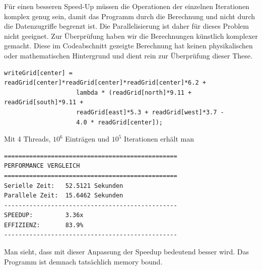 Für einen besseren Speed-Up müssen die Operationen der einzelnen Iterationen komplex genug sein, damit das Programm durch die Berechnung und nicht durch die Datenzugriffe begrenzt ist.
Die Parallelisierung ist daher für dieses Problem nicht geeignet.
Zur Überprüfung haben wir die Berechnungen künstlich komplexer gemacht.
Diese im Codeabschnitt gezeigte Berechnung hat keinen physikalischen oder mathematischen Hintergrund und dient rein zur Überprüfung dieser These.

\begin{lstlisting}
writeGrid[center] = readGrid[center]*readGrid[center]*readGrid[center]*6.2 +
					lambda * (readGrid[north]*9.11 + readGrid[south]*9.11 +
					readGrid[east]*5.3 + readGrid[west]*3.7 -
					4.0 * readGrid[center]);	
\end{lstlisting}

Mit 4 Threads, $10^6$ Einträgen und $10^5$ Iterationen erhält man 
\bgroup
\small
\begin{verbatim}
================================================
PERFORMANCE VERGLEICH
================================================
Serielle Zeit:   52.5121 Sekunden
Parallele Zeit:  15.6462 Sekunden
------------------------------------------------
SPEEDUP:         3.36x
EFFIZIENZ:       83.9%
------------------------------------------------
\end{verbatim}
\egroup
Man sieht, dass mit dieser Anpassung der Speedup bedeutend besser wird.
Das Programm ist demnach tatsächlich memory bound.
